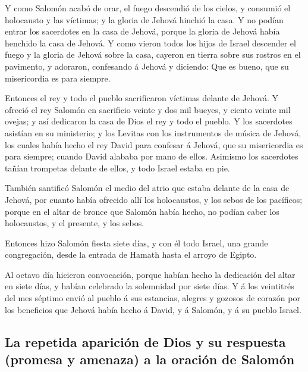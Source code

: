  Y como Salomón acabó de orar, el fuego descendió de los
cielos, y consumió el holocausto y las víctimas; y la gloria de Jehová
hinchió la casa.  Y no podían entrar los sacerdotes en la
casa de Jehová, porque la gloria de Jehová había henchido la casa de
Jehová.  Y como vieron todos los hijos de Israel descender
el fuego y la gloria de Jehová sobre la casa, cayeron en tierra sobre
sus rostros en el pavimento, y adoraron, confesando á Jehová y diciendo:
Que es bueno, que su misericordia es para siempre.

 Entonces el rey y todo el pueblo sacrificaron víctimas
delante de Jehová.  Y ofreció el rey Salomón en sacrificio
veinte y dos mil bueyes, y ciento veinte mil ovejas; y así dedicaron la
casa de Dios el rey y todo el pueblo.  Y los sacerdotes
asistían en su ministerio; y los Levitas con los instrumentos de música
de Jehová, los cuales había hecho el rey David para confesar á Jehová,
que su misericordia es para siempre; cuando David alababa por mano de
ellos. Asimismo los sacerdotes tañían trompetas delante de ellos, y todo
Israel estaba en pie.

 También santificó Salomón el medio del atrio que estaba
delante de la casa de Jehová, por cuanto había ofrecido allí los
holocaustos, y los sebos de los pacíficos; porque en el altar de bronce
que Salomón había hecho, no podían caber los holocaustos, y el presente,
y los sebos.

 Entonces hizo Salomón fiesta siete días, y con él todo
Israel, una grande congregación, desde la entrada de Hamath hasta el
arroyo de Egipto.

 Al octavo día hicieron convocación, porque habían hecho la
dedicación del altar en siete días, y habían celebrado la solemnidad por
siete días.  Y á los veintitrés del mes séptimo envió al
pueblo á sus estancias, alegres y gozosos de corazón por los beneficios
que Jehová había hecho á David, y á Salomón, y á su pueblo Israel.

\hypertarget{la-repetida-apariciuxf3n-de-dios-y-su-respuesta-promesa-y-amenaza-a-la-oraciuxf3n-de-salomuxf3n}{%
\subsection{La repetida aparición de Dios y su respuesta (promesa y
amenaza) a la oración de
Salomón}\label{la-repetida-apariciuxf3n-de-dios-y-su-respuesta-promesa-y-amenaza-a-la-oraciuxf3n-de-salomuxf3n}}

